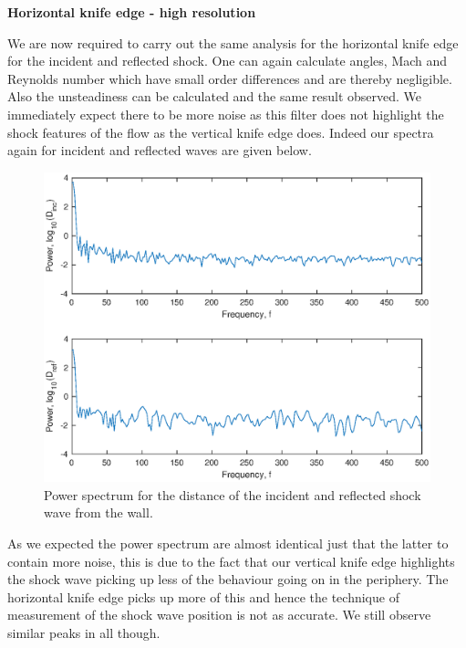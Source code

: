 \documentclass[a4paper,10pt,twoside]{article}
\begin{document}
\begin{multicols}{2}
\vspace{5mm}
\centerline{\textbf{Horizontal knife edge - high resolution}}
\vspace{5mm}





We are now required to carry out the same analysis for the horizontal knife edge for the incident and reflected shock. One can again calculate angles, Mach and Reynolds number which have small order differences and are thereby negligible. Also the unsteadiness can be calculated and the same result observed. We immediately expect there to be more noise as this filter does not highlight the shock features of the flow as the vertical knife edge does. Indeed our spectra again for incident and reflected waves are given below.



\begin{figure}[H]
    \centering
    \includegraphics[width=\linewidth]{horhighres.eps}
    \caption{Power spectrum for the distance of the incident and reflected shock wave from the wall.}
    \label{fig:my_label}
\end{figure}



As we expected the power spectrum are almost identical just that the latter to contain more noise, this is due to the fact that our vertical knife edge highlights the shock wave picking up less of the behaviour going on in the periphery. The horizontal knife edge picks up more of this and hence the technique of measurement of the shock wave position is not as accurate. We still observe similar peaks in all though. \par




\end{multicols}
\end{document}
